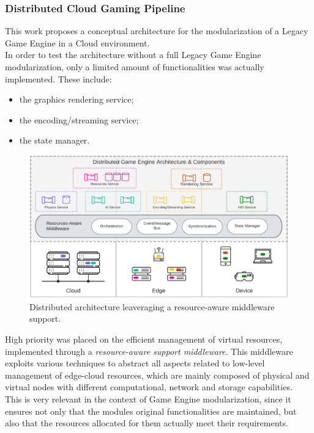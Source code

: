 \subsubsection{Distributed Cloud Gaming Pipeline \cite{womak:distributed-cloud-gaming-pipeline}}
This work proposes a conceptual architecture for the modularization of a Legacy Game Engine in a Cloud environment. \\
In order to test the architecture without a full Legacy Game Engine modularization, only a limited amount of functionalities was actually implemented. These include:
\begin{itemize}
	\item the graphics rendering service;
	\item the encoding/streaming service;
	\item the state manager.
\end{itemize}
\begin{figure}[h!]
	\centering
	\includegraphics[width=1\linewidth]{immagini/State-of-the-art/resource-aware-middleware-architecture}
	\caption[Distributed architecture leaveraging a resource-aware middleware support.]{Distributed architecture leaveraging a resource-aware middleware support.}
	\label{fig:resource-aware-middleware-architecture}
\end{figure}
High priority was placed on the efficient management of virtual resources, implemented through a \textit{resource-aware support middleware}. This middleware exploits various techniques to abstract all aspects related to low-level management of edge-cloud resources, which are mainly composed of physical and virtual nodes with different computational, network and storage capabilities. \\
This is very relevant in the context of Game Engine modularization, since it ensures not only that the modules original functionalities are maintained, but also that the resources allocated for them actually meet their requirements. \\ \\
